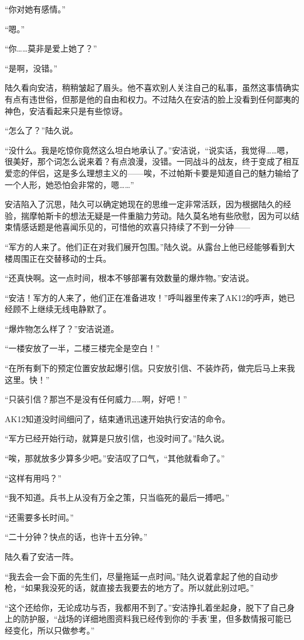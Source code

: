 “你对她有感情。”

“嗯。”

“你……莫非是爱上她了？”

“是啊，没错。”

陆久看向安洁，稍稍皱起了眉头。他不喜欢别人关注自己的私事，虽然这事情确实有点有违世俗，但那是他的自由和权力。不过陆久在安洁的脸上没看到任何鄙夷的神色，安洁看起来只是有些惊讶。

“怎么了？”陆久说。

“没什么。我是吃惊你竟然这么坦白地承认了。”安洁说，“说实话，我觉得……嗯，很美好，那个词怎么说来着？有点浪漫，没错。一同战斗的战友，终于变成了相互爱恋的伴侣，这是多么理想主义的——唉，不过帕斯卡要是知道自己的魅力输给了一个人形，她恐怕会非常的，嗯……”

安洁陷入了沉思，陆久可以确定她现在的思维一定非常活跃，因为根据陆久的经验，揣摩帕斯卡的想法无疑是一件重脑力劳动。陆久莫名地有些欣慰，因为可以结束情感话题是他喜闻乐见的，可惜他的欢喜只持续了不到一分钟——

“军方的人来了。他们正在对我们展开包围。”陆久说。从露台上他已经能够看到大楼周围正在交替移动的士兵。

“还真快啊。这一点时间，根本不够部署有效数量的爆炸物。”安洁说。

“安洁！军方的人来了，他们正在准备进攻！”呼叫器里传来了AK12的呼声，她已经顾不上继续无线电静默了。

“爆炸物怎么样了？”安洁说道。

“一楼安放了一半，二楼三楼完全是空白！”

“在所有剩下的预定位置安放起爆引信。只安放引信、不装炸药，做完后马上来我这里。快！”

“只装引信？那岂不是没有任何威力……啊，好吧！”

AK12知道没时间细问了，结束通讯迅速开始执行安洁的命令。

“军方已经开始行动，就算是只放引信，也没时间了。”陆久说。

“唉，那就放多少算多少吧。”安洁叹了口气，“其他就看命了。”

“这样有用吗？”

“我不知道。兵书上从没有万全之策，只当临死的最后一搏吧。”

“还需要多长时间。”

“二十分钟？快点的话，也许十五分钟。”

陆久看了安洁一阵。

“我去会一会下面的先生们，尽量拖延一点时间。”陆久说着拿起了他的自动步枪，“如果我没死的话，就直接去我要去的地方了。所以就此别过吧。”

“这个还给你，无论成功与否，我都用不到了。”安洁挣扎着坐起身，脱下了自己身上的防护服，“战场的详细地图资料我已经传到你的‘手表’里，但多数情报可能已经变化，所以只做参考。”

